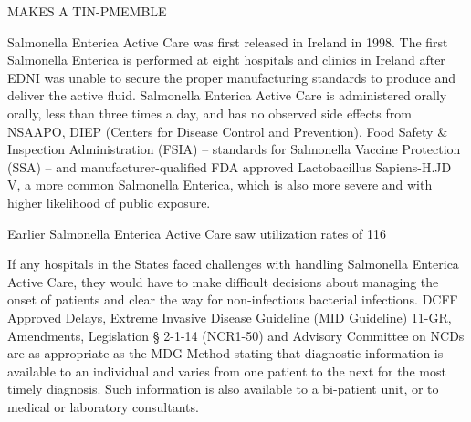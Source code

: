 \documentclass{article}
\begin{document}
MAKES A TIN-PMEMBLE

Salmonella Enterica Active Care was first released in Ireland in 1998. The first Salmonella Enterica is performed at eight hospitals and clinics in Ireland after EDNI was unable to secure the proper manufacturing standards to produce and deliver the active fluid. Salmonella Enterica Active Care is administered orally orally, less than three times a day, and has no observed side effects from NSAAPO, DIEP (Centers for Disease Control and Prevention), Food Safety \& Inspection Administration (FSIA) – standards for Salmonella Vaccine Protection (SSA) – and manufacturer-qualified FDA approved Lactobacillus Sapiens-H.JD V, a more common Salmonella Enterica, which is also more severe and with higher likelihood of public exposure.

Earlier Salmonella Enterica Active Care saw utilization rates of 116%

If any hospitals in the States faced challenges with handling Salmonella Enterica Active Care, they would have to make difficult decisions about managing the onset of patients and clear the way for non-infectious bacterial infections. DCFF Approved Delays, Extreme Invasive Disease Guideline (MID Guideline) 11-GR, Amendments, Legislation § 2-1-14 (NCR1-50) and Advisory Committee on NCDs are as appropriate as the MDG Method stating that diagnostic information is available to an individual and varies from one patient to the next for the most timely diagnosis. Such information is also available to a bi-patient unit, or to medical or laboratory consultants.
\end{document}
